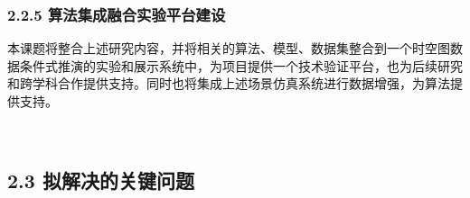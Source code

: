 \documentclass[12pt,UTF8,AutoFakeBold=2,a4paper]{ctexart} %
\begin{document}
%
\subsubsection{2.2.5 算法集成融合实验平台建设}
本课题将整合上述研究内容，并将相关的算法、模型、数据集整合到一个时空图数据条件式推演的实验和展示系统中，为项目提供一个技术验证平台，也为后续研究和跨学科合作提供支持。同时也将集成上述场景仿真系统进行数据增强，为算法提供支持。






\\



\subsection{2.3 拟解决的关键问题}
\end{document}
